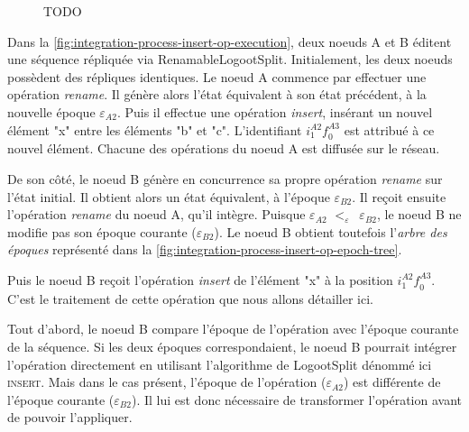 \documentclass[12pt]{thesul}
\newcommand{\trm}[1]{\mathit{#1}}
\newcommand{\id}[3]{$\trm{#1}^{\trm{#2}}_{\trm{#3}}$}
\newcommand{\epoch}[1]{$\varepsilon_{#1}$}
\newcommand{\lepoch}{$<_{\varepsilon}$~}
\begin{document}
\begin{figure}[t!]
{\begin{minipage}{\linewidth}
        \label{fig:integration-process-insert-op-epoch-tree}
    \end{minipage}}
  \caption{TODO}
  \label{fig:integration-process-insert-op}
\end{figure}


Dans la \autoref{fig:integration-process-insert-op-execution}, deux noeuds A et B éditent une séquence répliquée via RenamableLogootSplit.
Initialement, les deux noeuds possèdent des répliques identiques.
Le noeud A commence par effectuer une opération \emph{rename}.
Il génère alors l'état équivalent à son état précédent, à la nouvelle époque \epoch{A2}.
Puis il effectue une opération \emph{insert}, insérant un nouvel élément "x" entre les éléments "b" et "c".
L'identifiant \id{i}{A2}{1}\id{f}{A3}{0} est attribué à ce nouvel élément.
Chacune des opérations du noeud A est diffusée sur le réseau.

De son côté, le noeud B génère en concurrence sa propre opération \emph{rename} sur l'état initial.
Il obtient alors un état équivalent, à l'époque \epoch{B2}.
Il reçoit ensuite l'opération \emph{rename} du noeud A, qu'il intègre.
Puisque \epoch{A2} \lepoch \epoch{B2}, le noeud B ne modifie pas son époque courante (\epoch{B2}).
Le noeud B obtient toutefois l'\emph{arbre des époques} représenté dans la \autoref{fig:integration-process-insert-op-epoch-tree}.

Puis le noeud B reçoit l'opération \emph{insert} de l'élément "x" à la position \id{i}{A2}{1}\id{f}{A3}{0}.
C'est le traitement de cette opération que nous allons détailler ici.

Tout d'abord, le noeud B compare l'époque de l'opération avec l'époque courante de la séquence.
Si les deux époques correspondaient, le noeud B pourrait intégrer l'opération directement en utilisant l'algorithme de LogootSplit dénommé ici \textsc{insert}.
Mais dans le cas présent, l'époque de l'opération (\epoch{A2}) est différente de l'époque courante (\epoch{B2}).
Il lui est donc nécessaire de transformer l'opération avant de pouvoir l'appliquer.
\end{document}
